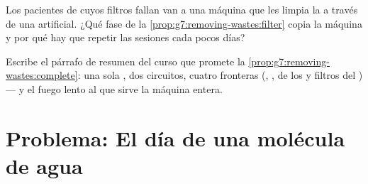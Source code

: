 \begin{exercise}[$\star\star$]\label{exo:g7:removing-wastes:11}
Los pacientes de  cuyos filtros fallan van a una máquina que les
limpia la  a través de una  artificial. ¿Qué fase de la
\cref{prop:g7:removing-wastes:filter} copia la máquina y por qué hay
que repetir las sesiones cada pocos días?
\end{exercise}

\begin{exercise}[$\star\star\star$]\label{exo:g7:removing-wastes:12}
Escribe el párrafo de resumen del curso que promete la
\cref{prop:g7:removing-wastes:complete}: una sola , dos
circuitos, cuatro fronteras (, ,  de los
 y filtros del ) --- y el fuego lento al que sirve la
máquina entera.
\end{exercise}

\section{Problema: El día de una molécula de agua}

